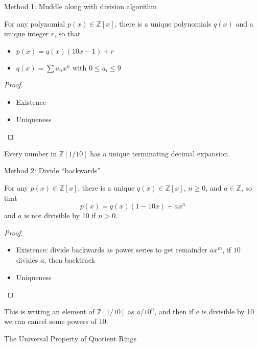 \documentclass{beamer}
\newcommand{\Z}{\mathbb{Z}}
\begin{document}
\begin{frame}{Method 1: Muddle along with division algorithm}
  \begin{lemma}
    For any polynomial $p(x)\in\Z[x]$, there is a unique polynomials $q(x)$ and a unique integer $r$, so that
    \begin{itemize}
    \item $p(x)=q(x)(10x-1)+r$
    \item $q(x)=\sum a_n x^n$ with $0\leq a_i\leq 9$
    \end{itemize}
  \end{lemma}

  \begin{proof}
    \begin{itemize}
    \item Existence
    \item Uniqueness
\end{itemize}
    \end{proof}

 Every number in $\Z[1/10]$ has a unique terminating decimal expansion.


  \end{frame}

\begin{frame}{Method 2: Divide ``backwards''}

  \begin{lemma} For any $p(x)\in\Z[x]$, there is a unique $q(x)\in\Z[x]$, $n\geq 0$, and $a\in\Z$, so that
    $$p(x)=q(x)(1-10x)+ax^n$$
and $a$ is not divisible by 10 if $n>0$.  
  \end{lemma}
  \begin{proof}
    \begin{itemize}
    \item Existence: divide backwards as power series to get remainder $ax^m$, if $10$ divides $a$, then backtrack
    \item Uniqueness
    \end{itemize}
  \end{proof}

  This is writing an element of $\Z[1/10]$ as $a/10^n$, and then if $a$ is divisible by 10 we can cancel some powers of 10.
    \end{frame}

\begin{frame}[plain,c]

\begin{center}

\Huge 

The Universal Property of Quotient Rings
\end{center}

\end{frame}
\end{document}
